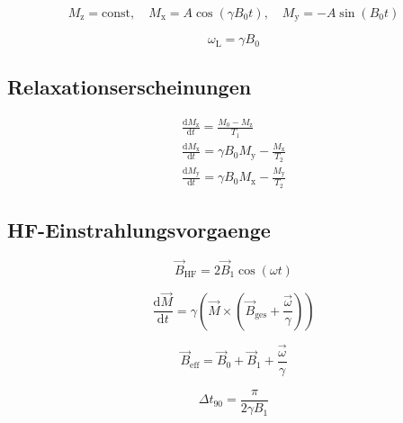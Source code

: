 \begin{equation}
		\label{eq:schwM}
		M_\text{z} = \text{const}, \hspace{1em} M_\text{x} = A \cos(\gamma B_0
		t ), \hspace{1em} M_\text{y} = -A \sin(B_0 t)
\end{equation}

\begin{equation}
		\label{eq:larmorf}
		\omega_\text{L} = \gamma B_0
\end{equation}

\subsection{Relaxationserscheinungen}%
\label{sub:relaxationserscheinungen}

\begin{eqnarray}
		\frac{\text{d} M_\text{z}}{\text{d} t} = \frac{M_0 - M_\text{z}}{T_1} \\
		\frac{\text{d} M_\text{x}}{\text{d} t} = \gamma B_0 M_\text{y} -
		\frac{M_\text{x}}{T_2} \\
		\frac{\text{d} M_\text{y}}{\text{d} t} = \gamma B_0 M_\text{x} - \frac{M_\text{y}}{T_2} 
\end{eqnarray}

\subsection{HF-Einstrahlungsvorgaenge}%
\label{sub:hf_einstrahlungsvorgaenge}

\begin{equation}
		\label{eq:bhf}
		\vec{B}_\text{HF} = 2 \vec{B}_1 \cos(\omega t)
\end{equation}

\begin{equation}
		\label{eq:moment}
		\frac{\text{d}\vec{M}}{\text{d} t} = \gamma \left( \vec{M} \times \left(
		\vec{B}_\text{ges} + \frac{\vec{\omega}}{\gamma} \right) \right)
\end{equation}

\begin{equation}
		\label{eq:sumB}
		\vec{B}_\text{eff} = \vec{B}_0 + \vec{B}_1 + \frac{\vec{\omega}}{\gamma}
\end{equation}

\begin{equation}
		\label{eq:90kick}
		\Delta t_{90} = \frac{\pi}{2 \gamma B_1}
\end{equation}

